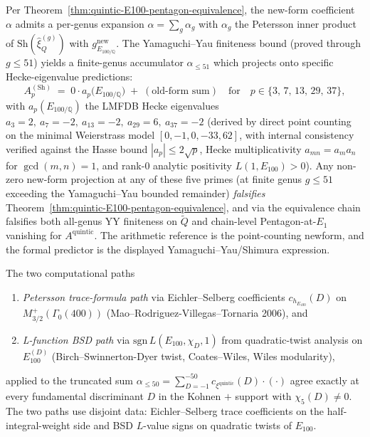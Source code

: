 \begin{remark}
\label{rem:quintic-hecke-falsifier}
Per Theorem~\ref{thm:quintic-E100-pentagon-equivalence}, the
new-form coefficient $\alpha$ admits a per-genus expansion
$\alpha = \sum_g \alpha_g$ with $\alpha_g$ the Petersson inner product
of $\mathrm{Sh}(\widehat{\xi}^{(g)}_Q)$ with $g^{\mathrm{new}}_{E_{100/\mathbb{Q}}}$.
The Yamaguchi--Yau finiteness bound \textup{(}proved through
$g \leq 51$\textup{)} yields a finite-genus accumulator
$\alpha_{\leq 51}$ which projects onto specific Hecke-eigenvalue
predictions:
\[
 A^{(\mathrm{Sh})}_p \;=\; 0 \cdot a_p\bigl(E_{100/\mathbb{Q}}\bigr)
 \;+\; (\text{old-form sum})
 \quad\text{for}\quad
 p \in \{3,\, 7,\, 13,\, 29,\, 37\},
\]
with $a_p(E_{100/\mathbb{Q}})$ the LMFDB Hecke eigenvalues
$a_3 = 2,\ a_7 = -2,\ a_{13} = -2,\ a_{29} = 6,\ a_{37} = -2$
\textup{(}derived by direct point counting on the minimal Weierstrass
model $[0,-1,0,-33,62]$, with internal consistency verified against
the Hasse bound $|a_p| \leq 2\sqrt{p}$, Hecke multiplicativity
$a_{mn} = a_m a_n$ for $\gcd(m, n) = 1$, and rank-$0$ analytic
positivity $L(1, E_{100}) > 0$\textup{).} Any non-zero new-form
projection at any of these five primes (at finite genus $g \leq 51$
exceeding the Yamaguchi--Yau bounded remainder)
\emph{falsifies} Theorem~\ref{thm:quintic-E100-pentagon-equivalence},
and via the equivalence chain falsifies both all-genus YY
finiteness on $\widetilde{Q}$ and chain-level Pentagon-at-$E_1$
vanishing for $A^{\mathrm{quintic}}$. The arithmetic reference is
the point-counting newform, and the formal predictor is the displayed
Yamaguchi--Yau/Shimura expression.
\end{remark}

\begin{proposition}
\label{prop:quintic-niwa-shintani-two-method-consistency}
The two computational paths
\begin{enumerate}[label=\textup{(\roman*)}]
\item \emph{Petersson trace-formula path} via Eichler--Selberg coefficients
 $c_{h_{E_{100}}}(D)$ on $M_{3/2}^{+}(\Gamma_0(400))$
 (Mao--Rodriguez-Villegas--Tornaria 2006), and
\item \emph{L-function BSD path} via $\mathrm{sgn}\,L(E_{100}, \chi_D, 1)$
 from quadratic-twist analysis on $E_{100}^{(D)}$ (Birch--Swinnerton-Dyer
 twist, Coates--Wiles, Wiles modularity),
\end{enumerate}
applied to the truncated sum
$\alpha_{\le 50} = \sum_{D = -1}^{-50}
 c_{\xi^{\mathrm{quintic}}}(D) \cdot (\cdot)$
agree exactly at every fundamental discriminant $D$ in the Kohnen $+$
support with $\chi_5(D) \ne 0$. The two paths use disjoint data:
Eichler--Selberg trace coefficients on the half-integral-weight side
and BSD \(L\)-value signs on quadratic twists of \(E_{100}\).
\end{proposition}

